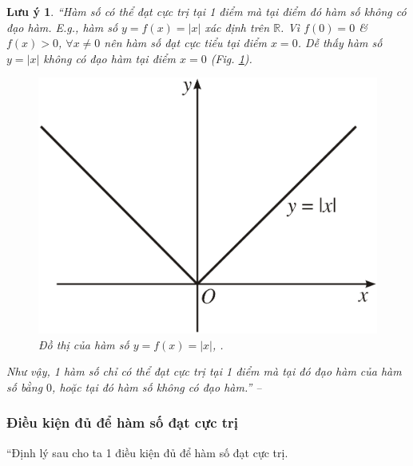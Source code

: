 \documentclass{article}
\numberwithin{equation}{section}
\newtheorem{luuy}{Lưu ý}[section]
\begin{document}
\begin{luuy}
	``Hàm số có thể đạt cực trị tại 1 điểm mà tại điểm đó hàm số không có đạo hàm. E.g., hàm số $y = f(x) = |x|$ xác định trên $\mathbb{R}$. Vì $f(0) = 0$ \& $f(x) > 0$, $\forall x\ne 0$ nên hàm số đạt cực tiểu tại điểm $x = 0$. Dễ thấy hàm số $y = |x|$ không có đạo hàm tại điểm $x = 0$ (Fig. \ref{fig:graph_abs}).
	
	\begin{figure}[h]
		\centering
		\includegraphics[scale=0.15]{graph_abs}
		\caption{Đồ thị của hàm số $y = f(x) = |x|$, \cite[Hình 1.3, p. 12]{SGK_Toan_12_giai_tich_nang_cao}.}
		\label{fig:graph_abs}
	\end{figure}
	Như vậy, 1 hàm số chỉ có thể đạt cực trị tại 1 điểm mà tại đó đạo hàm của hàm số bằng $0$, hoặc tại đó hàm số không có đạo hàm.'' -- \cite[p. 11]{SGK_Toan_12_giai_tich_nang_cao}
\end{luuy}

\subsubsection{Điều kiện đủ để hàm số đạt cực trị}
``Định lý sau cho ta 1 điều kiện đủ để hàm số đạt cực trị.
\end{document}
